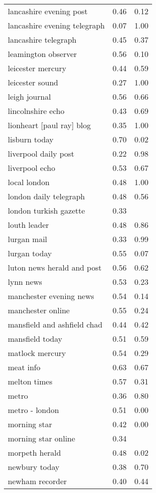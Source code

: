 \begin{longtable}{p{}p{}p{}}
  lancashire evening post & 0.46 & 0.12 \\ 
  lancashire evening telegraph & 0.07 & 1.00 \\ 
  lancashire telegraph & 0.45 & 0.37 \\ 
  leamington observer & 0.56 & 0.10 \\ 
  leicester mercury & 0.44 & 0.59 \\ 
  leicester sound & 0.27 & 1.00 \\ 
  leigh journal & 0.56 & 0.66 \\ 
  lincolnshire echo & 0.43 & 0.69 \\ 
  lionheart [paul ray] blog & 0.35 & 1.00 \\ 
  lisburn today & 0.70 & 0.02 \\ 
  liverpool daily post & 0.22 & 0.98 \\ 
  liverpool echo & 0.53 & 0.67 \\ 
  local london & 0.48 & 1.00 \\ 
  london daily telegraph & 0.48 & 0.56 \\ 
  london turkish gazette & 0.33 &  \\ 
  louth leader & 0.48 & 0.86 \\ 
  lurgan mail & 0.33 & 0.99 \\ 
  lurgan today & 0.55 & 0.07 \\ 
  luton news herald and post & 0.56 & 0.62 \\ 
  lynn news & 0.53 & 0.23 \\ 
  manchester evening news & 0.54 & 0.14 \\ 
  manchester online & 0.55 & 0.24 \\ 
  mansfield and ashfield chad & 0.44 & 0.42 \\ 
  mansfield today & 0.51 & 0.59 \\ 
  matlock mercury & 0.54 & 0.29 \\ 
  meat info & 0.63 & 0.67 \\ 
  melton times & 0.57 & 0.31 \\ 
  metro & 0.36 & 0.80 \\ 
  metro - london & 0.51 & 0.00 \\ 
  morning star & 0.42 & 0.00 \\ 
  morning star online & 0.34 &  \\ 
  morpeth herald & 0.48 & 0.02 \\ 
  newbury today & 0.38 & 0.70 \\ 
  newham recorder & 0.40 & 0.44 \\ 

\end{longtable}
